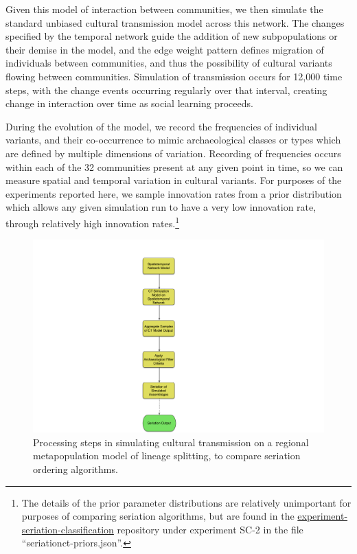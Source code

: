 Given this model of interaction between communities, we then simulate
the standard unbiased cultural transmission model across this network.
The changes specified by the temporal network guide the addition of new
subpopulations or their demise in the model, and the edge weight pattern
defines migration of individuals between communities, and thus the
possibility of cultural variants flowing between communities. Simulation
of transmission occurs for 12,000 time steps, with the change events
occurring regularly over that interval, creating change in interaction
over time as social learning proceeds.

During the evolution of the model, we record the frequencies of
individual variants, and their co-occurrence to mimic archaeological
classes or types which are defined by multiple dimensions of variation.
Recording of frequencies occurs within each of the 32 communities
present at any given point in time, so we can measure spatial and
temporal variation in cultural variants. For purposes of the experiments
reported here, we sample innovation rates from a prior distribution
which allows any given simulation run to have a very low innovation
rate, through relatively high innovation rates.\footnote{The details of
  the prior parameter distributions are relatively unimportant for
  purposes of comparing seriation algorithms, but are found in the
  \href{https://github.com/mmadsen/experiment-seriation-classification}{experiment-seriation-classification}
  repository under experiment SC-2 in the file
  ``seriationct-priors.json''.}

\begin{figure}[ht]
\centering
\includegraphics[scale=0.4]{graphics/multipleseriation/seriationct-high-level-flow.pdf}
\caption{Processing steps in simulating cultural transmission on a regional metapopulation model of lineage splitting, to compare seriation ordering algorithms.}
\label{img:seriationct-flow}
\end{figure}

